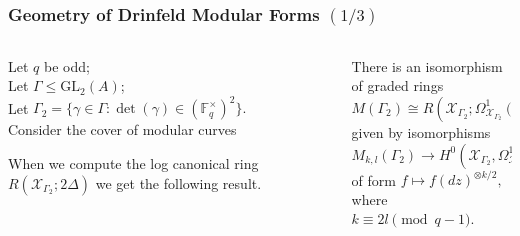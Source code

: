 \documentclass[handout]{beamer}
\numberwithin{equation}{section}
\numberwithin{case}{theorem}
\newcommand{\sX}{\mathscr{X}}		%
\newcommand{\bbF}{\mathbb{F}}		%
\newcommand{\GL}{\mathrm{GL}} 	%
\newcommand{\<}{\left\langle}
\renewcommand{\>}{\right\rangle}
\begin{document}
	\begin{frame}
		\frametitle{Geometry of Drinfeld Modular Forms $(1/3)$}
		\begin{columns} 
			\begin{column}{.5\textwidth}
				Let $q$ be odd;\\
				Let $\Gamma\leq \GL_2(A)$;\\ 
				Let $\Gamma_2=\{\gamma\in \Gamma:\det(\gamma)\in (\bbF_q^{\times})^2\}.$ \pause\\
				Consider the cover of modular curves
				\begin{figure}[!h]\centering
				\end{figure}\pause
				When we compute the log canonical ring $R(\sX_{\Gamma_2}; 2\Delta)$ we get the following result.
			\end{column}\pause
			\begin{column}{.5\textwidth}
				\begin{theorem}
					There is an isomorphism of graded rings \[M(\Gamma_2)\cong R(\sX_{\Gamma_2};\Omega^1_{\sX_{\Gamma_2}}(2\Delta)),\]\pause
					given by isomorphisms \[M_{k,l}(\Gamma_2)\to H^0(\sX_{\Gamma_2},\Omega^1_{\sX_{\Gamma_2}}(2\Delta)^{\otimes k/2})\] of form $f\mapsto f(dz)^{\otimes k/2},$ \pause where \\$k\equiv 2l\pmod{q-1}.$ 
				\end{theorem}
			\end{column}
		\end{columns}
	\end{frame}
	
\end{document}
